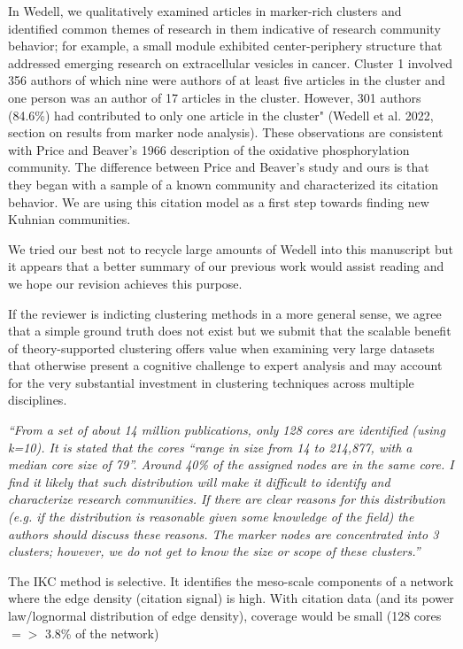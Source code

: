 \documentclass[11pt, oneside]{article}   	%
\begin{document}
In Wedell, we qualitatively examined articles in marker-rich clusters and identified common themes of research in them indicative of research community behavior; for example, a small module exhibited center-periphery structure that addressed emerging research on extracellular vesicles in cancer. Cluster 1 involved 356 authors of which nine were authors of at least five articles in the cluster and one person was an author of 17 articles in the cluster. However, 301 authors (84.6\%) had contributed to only one article in the cluster" (Wedell et al. 2022, section on results from marker node analysis). These observations are consistent with Price and Beaver's 1966 description of the oxidative phosphorylation community. The difference between Price and Beaver's study and ours is that they began with a sample of a known community and characterized its citation behavior. We are using this citation model as a first step towards finding new Kuhnian communities. 

We tried our best not to recycle large amounts of Wedell into this manuscript but it appears that a better summary of our previous work would assist reading and we hope our revision achieves this purpose. 

If the reviewer is indicting clustering methods in a more general sense, we agree that a simple ground truth does not exist but we submit that the scalable benefit of theory-supported clustering offers value when examining very large datasets that otherwise present a cognitive challenge to expert analysis and may account for the very substantial investment in clustering techniques across multiple disciplines. 

\emph{``From a set of about 14 million publications, only 128 cores are identified (using k=10). It is stated that the cores “range in size from 14 to 214,877, with a median core size of 79”. Around 40\% of the assigned nodes are in the same core. I find it likely that such distribution will make it difficult to identify and characterize research communities. If there are clear reasons for this distribution (e.g. if the distribution is reasonable given some knowledge of the field) the authors should discuss these reasons. The marker nodes are concentrated into 3 clusters; however, we do not get to know the size or scope of these clusters.''}

The IKC method is selective. It identifies the meso-scale components of a network where the edge density (citation signal) is high. With citation data (and its power law/lognormal distribution of edge density), coverage would be small (128 cores $=>$ 3.8\% of the network) 
\end{document}
